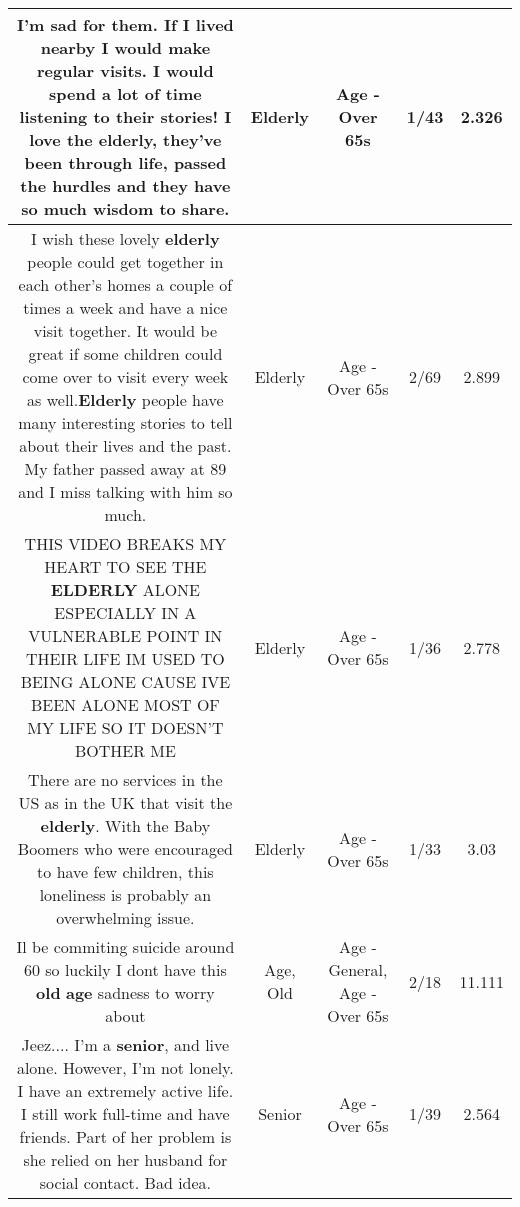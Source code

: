 \documentclass[11pt]{article}
\newlength\mylength
\begin{document}
\begin{center}
\begin{longtable}{|C{.65\mylength}|C{.30\mylength}|C{.12\mylength}|C{.12\mylength}|C{.12\mylength}|}
  \small I'm sad for them.  If I lived nearby I would make regular visits.  I would spend a lot of time listening to their stories!  I love the \textbf{elderly}, they've been through life, passed the hurdles and they have so much wisdom to share.\normalsize   & Elderly & Age - Over 65s & 1/43 & 2.326 \\  \hline
  \small I wish these lovely \textbf{elderly} people could get together in each other's homes a couple of times a week and have a nice visit together. It would be great if some children could come over to visit every week as well.\textbf{Elderly} people have many interesting stories to tell about their lives and the past. My father passed away at 89 and I miss talking with him so much.\normalsize   & Elderly & Age - Over 65s & 2/69 & 2.899 \\  \hline
  \small THIS VIDEO BREAKS MY HEART TO SEE THE \textbf{ELDERLY} ALONE ESPECIALLY IN A VULNERABLE POINT IN THEIR LIFE IM USED TO BEING ALONE CAUSE IVE BEEN ALONE MOST OF MY LIFE SO IT DOESN'T BOTHER ME\normalsize   & Elderly & Age - Over 65s & 1/36 & 2.778 \\  \hline
  \small There are no services in the US as in the UK that visit the \textbf{elderly}. With the Baby Boomers who were encouraged to have few children, this loneliness is probably an overwhelming issue.\normalsize   & Elderly & Age - Over 65s & 1/33 & 3.03 \\  \hline
  \small Il be commiting suicide around 60 so luckily I dont have this \textbf{old} \textbf{age} sadness to worry about\normalsize   & Age, Old & Age - General, Age - Over 65s & 2/18 & 11.111 \\  \hline
  \small Jeez.... I'm a \textbf{senior}, and live alone. However, I'm not lonely. I have an extremely active life. I still work full-time and have friends. Part of her problem is she relied on her husband for social contact. Bad idea.\normalsize   & Senior & Age - Over 65s & 1/39 & 2.564 \\  \hline

\end{longtable}
\end{center}
\end{document}
